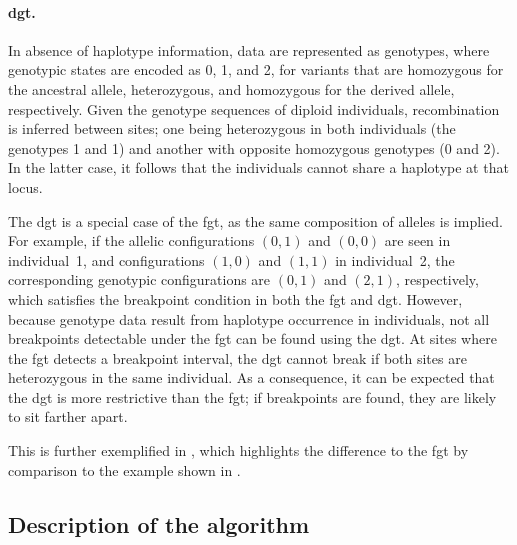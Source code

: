 \paragraph{\Gls{dgt}.}
In absence of haplotype information, data are represented as genotypes, where genotypic states are encoded as 0, 1, and 2, for variants that are homozygous for the ancestral allele, heterozygous, and homozygous for the derived allele, respectively.
Given the genotype sequences of  diploid individuals, recombination is inferred between  sites; one being heterozygous in both individuals (\ie the genotypes 1 and 1) and another with opposite homozygous genotypes (0 and 2).
In the latter case, it follows that the  individuals cannot share a haplotype at that locus.

The \gls{dgt} is a special case of the \gls{fgt}, as the same composition of alleles is implied.
For example, if the allelic configurations ${(0,1)}$ and ${(0,0)}$ are seen in individual~1, and configurations ${(1,0)}$ and ${(1,1)}$ in individual~2, the corresponding genotypic configurations are ${(0,1)}$ and ${(2,1)}$, respectively, which satisfies the breakpoint condition in both the \gls{fgt} and \gls{dgt}.
However, because genotype data result from haplotype occurrence in individuals, not all breakpoints detectable under the \gls{fgt} can be found using the \gls{dgt}.
At sites where the \gls{fgt} detects a breakpoint interval, the \gls{dgt} cannot break if both sites are heterozygous in the same individual.
As a consequence, it can be expected that the \gls{dgt} is more restrictive than the \gls{fgt}; \eg if breakpoints are found, they are likely to sit farther apart.

%

%

This is further exemplified in , which highlights the difference to the \gls{fgt} by comparison to the example shown in .


%
\subsection{Description of the algorithm}
%

